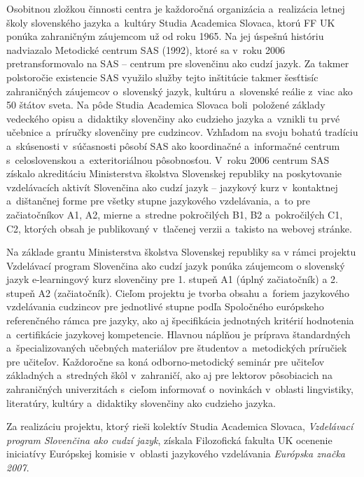 \begin{multicols}{2}
Osobitnou zložkou činnosti centra je každoročná organizácia a~realizácia letnej školy slovenského jazyka a~kultúry Studia Academica Slovaca, ktorú FF UK ponúka zahraničným záujemcom už od roku 1965. Na jej úspešnú históriu nadviazalo Metodické centrum SAS (1992), ktoré sa v~roku 2006 pretransformovalo na SAS – centrum pre slovenčinu ako cudzí jazyk. Za takmer polstoročie existencie SAS využilo služby tejto inštitúcie takmer šesťtisíc zahraničných záujemcov o~slovenský jazyk, kultúru a~slovenské reálie z~viac ako 50 štátov sveta. Na pôde Studia Academica Slovaca boli~položené základy vedeckého opisu a~didaktiky slovenčiny ako cudzieho jazyka a~vznikli tu prvé učebnice a~príručky slovenčiny pre cudzincov. Vzhľadom na svoju bohatú tradíciu a~skúsenosti v~súčasnosti pôsobí SAS ako koordinačné a~informačné centrum s~celoslovenskou a~exteritoriálnou pôsobnosťou.
V~roku 2006 centrum SAS získalo akreditáciu Ministerstva školstva Slovenskej republiky na poskytovanie vzdelávacích aktivít Slovenčina ako cudzí jazyk – jazykový kurz v~kontaktnej a~dištančnej forme pre všetky stupne jazykového vzdelávania, a~to pre začiatočníkov A1, A2, mierne a~stredne pokročilých B1, B2 a~pokročilých C1, C2, ktorých obsah je publikovaný v~tlačenej verzii \cite{pekarovicova2007} a~takisto na webovej stránke.\cite{f9}

Na základe grantu Ministerstva školstva Slovenskej republiky sa v rámci projektu Vzdelávací program Slovenčina ako cudzí jazyk ponúka záujemcom o slovenský jazyk e-learningový kurz slovenčiny\cite{f33} pre 1. stupeň A1 (úplný začiatočník) a 2. stupeň A2 (začiatočník). Cieľom projektu je tvorba obsahu a~foriem jazykového vzdelávania cudzincov pre jednotlivé stupne podľa Spoločného európskeho referenčného rámca pre jazyky, ako aj špecifikácia jednotných kritérií hodnotenia a~certifikácie jazykovej kompetencie. Hlavnou náplňou je príprava štandardných a~špecializovaných učebných materiálov pre študentov a~metodických príručiek pre učiteľov. Každoročne sa koná odborno-metodický seminár pre učiteľov základných a~stredných škôl v~zahraničí, ako aj pre lektorov pôsobiacich na zahraničných univerzitách s~cieľom informovať o~novinkách v~oblasti lingvistiky, literatúry, kultúry a~didaktiky slovenčiny ako cudzieho jazyka.

Za realizáciu projektu, ktorý rieši kolektív Studia Academica Slovaca, \emph{Vzdelávací program Slovenčina ako cudzí jazyk}, získala Filozofická fakulta UK ocenenie iniciatívy Európskej komisie v~oblasti jazykového vzdelávania \emph{Európska značka 2007}.


\end{multicols}
